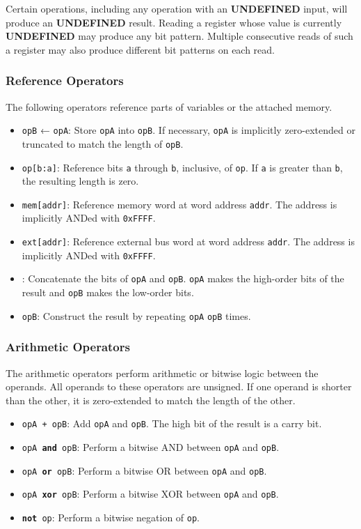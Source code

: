 \documentclass[12pt,a4paper]{article}
\newcommand{\undefined}{\textbf{UNDEFINED}}
\begin{document}
Certain operations, including any operation with an \undefined{} input, will produce an \undefined{} result. Reading a register whose value is currently \undefined{} may produce any bit pattern. Multiple consecutive reads of such a register may also produce different bit patterns on each read.

\subsubsection{Reference Operators}
The following operators reference parts of variables or the attached memory.

\begin{itemize}
  \item \texttt{opB} ← \texttt{opA}: Store \texttt{opA} into \texttt{opB}. If necessary, \texttt{opA} is implicitly zero-extended or truncated to match the length of \texttt{opB}.
  \item \texttt{op[b:a]}: Reference bits \texttt{a} through \texttt{b}, inclusive, of \texttt{op}. If \texttt{a} is greater than \texttt{b}, the resulting length is zero. 
  \item \texttt{mem[addr]}: Reference memory word at word address \texttt{addr}. The address is implicitly ANDed with \texttt{0xFFFF}.
  \item \texttt{ext[addr]}: Reference external bus word at word address \texttt{addr}. The address is implicitly ANDed with \texttt{0xFFFF}.
  \item \texttt{}: Concatenate the bits of \texttt{opA} and \texttt{opB}. \texttt{opA} makes the high-order bits of the result and \texttt{opB} makes the low-order bits.
  \item \texttt{opB}: Construct the result by repeating \texttt{opA} \texttt{opB} times.
\end{itemize}

\subsubsection{Arithmetic Operators}
The arithmetic operators perform arithmetic or bitwise logic between the operands. All operands to these operators are unsigned. If one operand is shorter than the other, it is zero-extended to match the length of the other.

\begin{itemize}
  \item \texttt{opA + opB}: Add \texttt{opA} and \texttt{opB}. The high bit of the result is a carry bit.
  \item \texttt{opA \textbf{and} opB}: Perform a bitwise AND between \texttt{opA} and \texttt{opB}.
  \item \texttt{opA \textbf{or} opB}: Perform a bitwise OR between \texttt{opA} and \texttt{opB}.
  \item \texttt{opA \textbf{xor} opB}: Perform a bitwise XOR between \texttt{opA} and \texttt{opB}.
  \item \texttt{\textbf{not} op}: Perform a bitwise negation of \texttt{op}.
\end{itemize}
\end{document}
